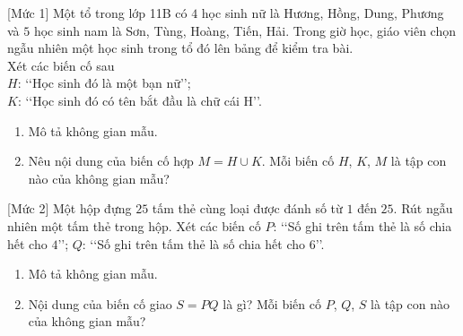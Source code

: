 \begin{bt}%
[Mức 1]
	Một tổ trong lớp 11B có $4$ học sinh nữ là Hương, Hồng, Dung, Phương và $5$ học sinh nam là Sơn, Tùng, Hoàng, Tiến, Hải. Trong giờ học, giáo viên chọn ngẫu nhiên một học sinh trong tổ đó lên bảng để kiểm tra bài.\\
	Xét các biến cố sau\\
	$H$: \lq\lq Học sinh đó là một bạn nữ\rq\rq;\\
	$K$: \lq\lq Học sinh đó có tên bắt đầu là chữ cái $\mathrm{H}$\rq\rq.
	\begin{enumerate}
		\item Mô tả không gian mẫu.
		\item Nêu nội dung của biến cố hợp $M = H \cup K$. Mỗi biến cố $H$, $K$, $M$ là tập con nào của không gian mẫu?
	\end{enumerate}
\end{bt}

\begin{bt}%
[Mức 2]
	Một hộp đựng $25$ tấm thẻ cùng loại được đánh số từ $1$ đến $25$. Rút ngẫu nhiên một tấm thẻ trong hộp. Xét các biến cố $P$: \lq\lq Số ghi trên tấm thẻ là số chia hết cho $4$\rq\rq; $Q$: \lq\lq Số ghi trên tấm thẻ là số chia hết cho $6$\rq\rq.
	\begin{enumerate}
		\item Mô tả không gian mẫu.
		\item Nội dung của biến cố giao $S=P Q$ là gì? Mỗi biến cố $P$, $Q$, $S$ là tập con nào của không gian mẫu?
	\end{enumerate} 
\end{bt}


